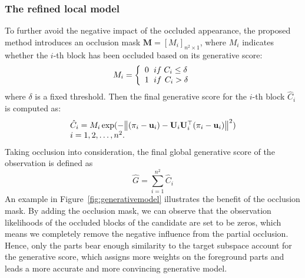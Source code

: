 \documentclass[preprint,12pt,review]{elsarticle}
\newcommand{\ignore}[1]{}
\begin{document}
\subsubsection{The refined local model}
To further avoid the negative impact of the occluded appearance, the proposed method introduces an occlusion mask $\mathbf{M}=[M_i]_{n^2 \times 1}$, where $M_i$ indicates whether the $i$-th block has been occluded based on its generative score:
%
%
\begin{equation}   \label{eq:mask}
{M_{i}} = \left\{ \begin{array}{l}
0{\kern 1pt} {\kern 1pt} {\kern 1pt} {\kern 1pt} {\kern 1pt} {\kern 1pt} if{\kern 1pt} {\kern 1pt} {\kern 1pt} {C_{i}} \le \delta \\
1{\kern 1pt} {\kern 1pt} {\kern 1pt} {\kern 1pt} {\kern 1pt} {\kern 1pt} if{\kern 1pt} {\kern 1pt} {\kern 1pt} {\kern 1pt} {C_{i}} > \delta
\end{array} \right.
\end{equation}
%
where $\delta$ is a fixed threshold.
%
Then the final generative score for the $i$-th block $\hat{C}_{i}$ is computed as:
\begin{equation}  \label{eq:refinedmask}
\begin{array}{l}
{\hat{C}_i} = {M_i}\exp ( - {\left\| {({\bf{\pi}}_i - {{\bf{u}}_i}) - {{\bf{U}}_i}{\bf{U}}_i^{\top}({\bf{\pi}}_i - {{\bf{u}}_i})} \right\|^2})\\
i = 1,2,\ldots,{n^2}.
\end{array}
\end{equation}
%
Taking occlusion into consideration, the final global generative score of the observation is defined as
\begin{equation} \label{eq:refinedmodel}
  \hat{G} = \sum \limits_{i=1}^{n^2} \hat{C}_i
\end{equation}
An example in Figure~\ref{fig:generativemodel} illustrates the benefit of the occlusion mask.
%
By adding the occlusion mask, we can observe that the observation likelihoods of the occluded blocks of the candidate are set to be zeros, which means we completely remove the negative influence from the partial occlusion.
%
Hence, only the parts bear enough similarity to the target subspace account for the generative score, which assigns more weights on the foreground parts and leads a more accurate and more convincing generative model.
%
\ignore{
Due to temporal contiguity of video clips, the occlusion masks between two consecutive frames remain almost the same.
%
Thus, the occlusion mask formed in frame $t$ is then used in frame ${t+1}$ to calculate $C_{i}$.
}
\end{document}

